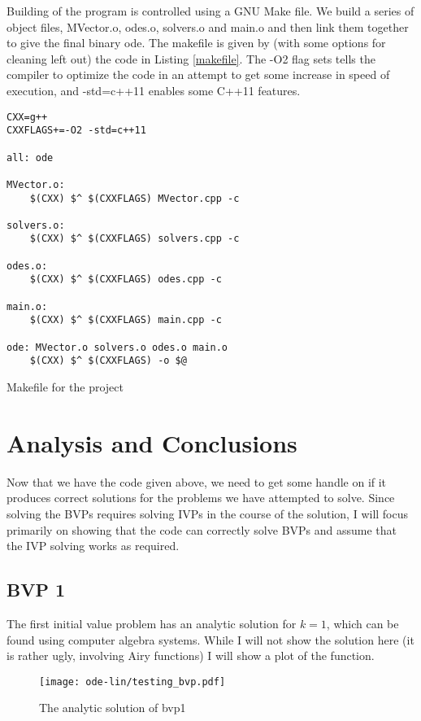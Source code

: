 \documentclass[a4paper,11pt]{report}
\begin{document}
{{{Building of the program is controlled using a GNU Make file. We build a series of object files, MVector.o, odes.o, solvers.o and main.o and then link them together to give the final binary ode. The makefile is given by (with some options for cleaning left out) the code in Listing \ref{makefile}. The -O2 flag sets tells the compiler to optimize the code in an attempt to get some increase in speed of execution, and -std=c++11 enables some C++11 features.

\begin{listing}[H]
\begin{verbatim}
CXX=g++
CXXFLAGS+=-O2 -std=c++11

all: ode

MVector.o:
	$(CXX) $^ $(CXXFLAGS) MVector.cpp -c

solvers.o:
	$(CXX) $^ $(CXXFLAGS) solvers.cpp -c

odes.o:
	$(CXX) $^ $(CXXFLAGS) odes.cpp -c

main.o:
	$(CXX) $^ $(CXXFLAGS) main.cpp -c

ode: MVector.o solvers.o odes.o main.o
	$(CXX) $^ $(CXXFLAGS) -o $@
\end{verbatim}
\caption{Makefile for the project}
\label{makefile}
\end{listing}
\vfill

\chapter{Analysis and Conclusions}

Now that we have the code given above, we need to get some handle on if it produces correct solutions for the problems we have attempted to solve. Since solving the BVPs requires solving IVPs in the course of the solution, I will focus primarily on showing that the code can correctly solve BVPs and assume that the IVP solving works as required.

\section{BVP 1}

The first initial value problem has an analytic solution for $k=1$, which can be found using computer algebra systems. While I will not show the solution here (it is rather ugly, involving Airy functions) I will show a plot of the function.

\begin{figure}[H]
\centering
\texttt{[image: ode-lin/testing\_bvp.pdf]}
\caption{The analytic solution of bvp1}
\end{figure}

}}}
\end{document}
